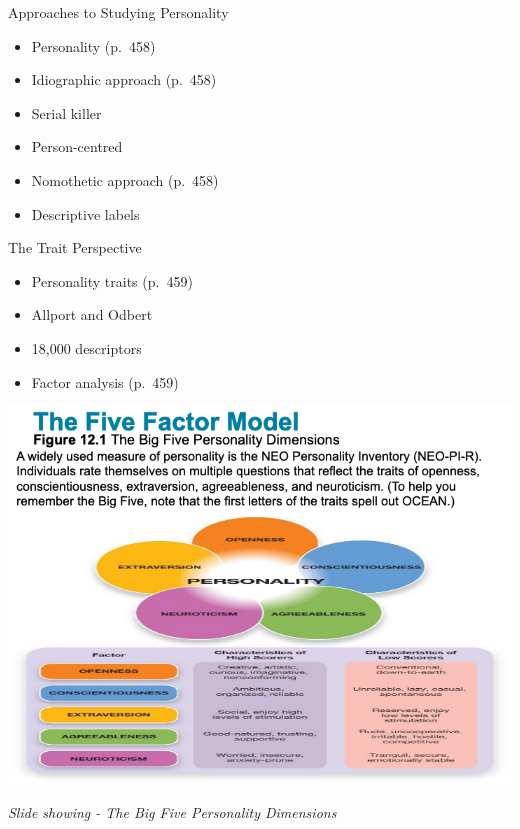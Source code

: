 \documentclass[
]{book}
\providecommand{\tightlist}{%
  \setlength{\itemsep}{0pt}\setlength{\parskip}{0pt}}
\begin{document}
\begin{reflect}
Approaches to Studying Personality

\begin{itemize}
\tightlist
\item
  Personality (p.~458)\\
\item
  Idiographic approach (p.~458)\\
\item
  Serial killer\\
\item
  Person-centred\\
\item
  Nomothetic approach (p.~458)\\
\item
  Descriptive labels
\end{itemize}

The Trait Perspective

\begin{itemize}
\tightlist
\item
  Personality traits (p.~459)\\
\item
  Allport and Odbert\\
\item
  18,000 descriptors\\
\item
  Factor analysis (p.~459)
\end{itemize}

\includegraphics{assets/unit_5/slide_11.png}

\emph{Slide showing - The Big Five Personality Dimensions}


\end{reflect}
\end{document}
